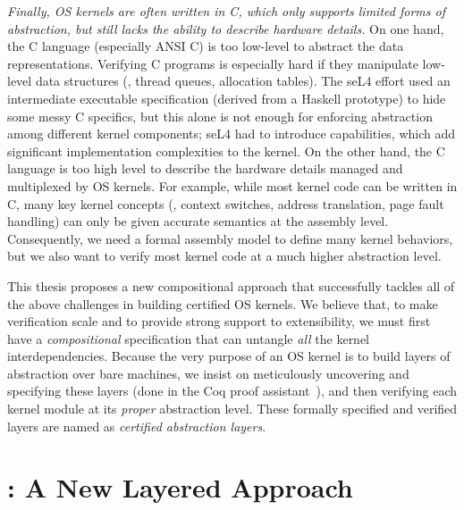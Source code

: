 {\em Finally, OS kernels are often written in C, which only supports
  limited forms of abstraction,
  but still lacks the ability to describe hardware details.}
On one hand, the C language (especially ANSI C) is
  too low-level to abstract the data representations.
Verifying C programs is
especially hard if they manipulate low-level data structures (\eg,
thread queues, allocation tables). The seL4 effort used an
intermediate executable specification (derived from a Haskell
prototype) to hide some messy C specifics, but this alone is not
enough for enforcing abstraction among different kernel components;
seL4 had to introduce capabilities, which add significant
implementation complexities to the kernel.
On the other hand, the C language is
too high level to describe the hardware details
managed and multiplexed by OS kernels.
For example, while most kernel code
can be written in C, many key kernel concepts (\eg, context switches,
address translation, page fault handling) can only be given accurate
semantics at the assembly level. Consequently, we need a formal
assembly model to define many kernel behaviors, but we also want to
verify most kernel code at a much higher abstraction level.



This thesis proposes a new compositional approach that
successfully tackles all of the above challenges in building certified
OS kernels. We believe that, to make verification scale and to provide
strong support to extensibility, we must first have a {\em
  compositional} specification that can untangle {\em all} the kernel
interdependencies. Because the very purpose of an OS kernel is to
build layers of abstraction over bare machines, we insist on
meticulously uncovering and specifying these layers (done in the Coq
proof assistant~\cite{coq}), and then verifying each kernel module at
its {\em proper} abstraction level.
These formally specified and verified layers
are named as {\em certified abstraction layers}.

\section{\CTOS{}: A New Layered Approach}
\label{sec:intro:layer}

